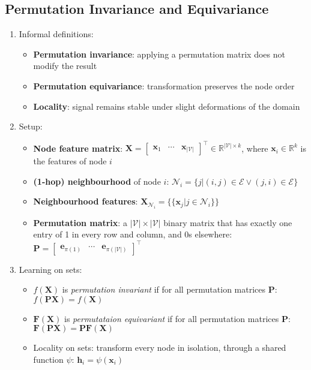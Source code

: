\documentclass{article}
\begin{document}
\subsection{Permutation Invariance and Equivariance}

\begin{enumerate}
	\item Informal definitions:
	\begin{itemize}[topsep=0pt]
		\item \textbf{Permutation invariance}: applying a permutation matrix does not modify the result
		\item \textbf{Permutation equivariance}: transformation preserves the node order
		\item \textbf{Locality}: signal remains stable under slight deformations of the domain
	\end{itemize}

	\item Setup:
	\begin{itemize}[topsep=0pt]
		\item \textbf{Node feature matrix}: $\mathbf{X}=\begin{bmatrix}
			\mathbf{x}_1 & \cdots & \mathbf{x}_{|\mathcal{V}|}
		\end{bmatrix}^\top\in\mathbb{R}^{|\mathcal{V}|\times k}$, where $\mathbf{x}_i\in\mathbb{R}^k$ is the features of node $i$
		\item \textbf{(1-hop) neighbourhood} of node $i$: $\mathcal{N}_i=\big\{j\big|(i,j)\in\mathcal{E}\vee(j,i)\in\mathcal{E}\big\}$
		\item \textbf{Neighbourhood features}: $\mathbf{X}_{\mathcal{N}_i}=\{\!\{\mathbf{x}_j|j\in\mathcal{N}_i\}\!\}$
		\item \textbf{Permutation matrix}: a $|\mathcal{V}|\times|\mathcal{V}|$ binary matrix that has exactly one entry of 1 in every row and column, and 0s elsewhere: $\mathbf{P}=\begin{bmatrix}
			\mathbf{e}_{\pi(1)} & \cdots & \mathbf{e}_{\pi(|\mathcal{V}|)}
		\end{bmatrix}^\top$
	\end{itemize}

	\item Learning on sets:
	\begin{itemize}[topsep=0pt]
		\item $f(\mathbf{X})$ is \textit{permutation invariant} if for all permutation matrices $\mathbf{P}$: $f(\mathbf{PX})=f(\mathbf{X})$
		\item $\bm{F}(\mathbf{X})$ is \textit{permutataion equivariant} if for all permutation matrices $\mathbf{P}$: $\bm{F}(\mathbf{PX})=\mathbf{P}\bm{F}(\mathbf{X})$ 
		\item Locality on sets: transform every node in isolation, through a shared function $\psi$: $\mathbf{h}_i=\psi(\mathbf{x}_i)$
		

\end{itemize}
\end{enumerate}
\end{document}
